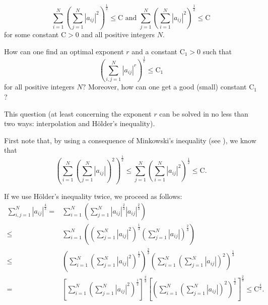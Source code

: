 \documentclass[10pt]{amsart}
\numberwithin{equation}{section}
\begin{document}
\begin{equation}
\sum\limits_{i=1}^{N}\left( \sum\limits_{j=1}^{N}\left\vert
a_{ij}\right\vert ^{2}\right) ^{\frac{1}{2}}\leq \mathrm{C}\text{ and }\sum\limits_{j=1}^{N}\left( \sum\limits_{i=1}^{N}\left\vert
a_{ij}\right\vert ^{2}\right) ^{\frac{1}{2}}\leq \mathrm{C}  \label{221}
\end{equation}for some constant $\mathrm{C}>0$ and all positive integers $N$.

How can one find an optimal exponent $r$ and a constant $\mathrm{C}_{1}>0$
such that\begin{equation*}
\left( \sum\limits_{i,j=1}^{N}\left\vert a_{ij}\right\vert ^{r}\right) ^{\frac{1}{r}}\leq \mathrm{C}_{1}
\end{equation*}for all positive integers $N?$ Moreover, how can one get a good (small)
constant $\mathrm{C}_{1}$?

This question (at least concerning the exponent $r$ can be solved in no less
than two ways: interpolation and H\"{o}lder's inequality).

First note that, by using a consequence of Minkowski's inequality (see \cite{garling}), we know that
\begin{equation}
\left( \sum\limits_{i=1}^{N}\left( \sum\limits_{j=1}^{N}\left\vert
a_{ij}\right\vert \right) ^{2}\right) ^{\frac{1}{2}}\leq
\sum\limits_{j=1}^{N}\left( \sum\limits_{i=1}^{N}\left\vert
a_{ij}\right\vert ^{2}\right) ^{\frac{1}{2}}\leq \mathrm{C}.  \label{222}
\end{equation}

If we use H\"{o}lder's inequality twice, we proceed as follows:
\begin{align*}
\sum\limits_{i,j=1}^{N}\left\vert a_{ij}\right\vert ^{\frac{4}{3}} = &
\sum\limits_{i=1}^{N}\left( \sum\limits_{j=1}^{N}\left\vert
a_{ij}\right\vert ^{\frac{2}{3}}\left\vert a_{ij}\right\vert ^{\frac{2}{3}}\right) \\
\leq & \sum\limits_{i=1}^{N}\left( \left( \sum\limits_{j=1}^{N}\left\vert
a_{ij}\right\vert ^{2}\right) ^{\frac{1}{3}}\left(
\sum\limits_{j=1}^{N}\left\vert a_{ij}\right\vert \right) ^{\frac{2}{3}}\right) \\
\leq & \left( \sum\limits_{i=1}^{N}\left( \sum\limits_{j=1}^{N}\left\vert
a_{ij}\right\vert ^{2}\right) ^{\frac{1}{2}}\right) ^{\frac{2}{3}}\left(
\sum\limits_{i=1}^{N}\left( \sum\limits_{j=1}^{N}\left\vert
a_{ij}\right\vert \right) ^{2}\right) ^{\frac{1}{3}} \\
= & \left[ \sum\limits_{i=1}^{N}\left( \sum\limits_{j=1}^{N}\left\vert
a_{ij}\right\vert ^{2}\right) ^{\frac{1}{2}}\right] ^{\frac{2}{3}}\left[
\left( \sum\limits_{i=1}^{N}\left( \sum\limits_{j=1}^{N}\left\vert
a_{ij}\right\vert \right) ^{2}\right) ^{\frac{1}{2}}\right] ^{\frac{2}{3}}
\leq \mathrm{C}^{\frac{4}{3}}.
\end{align*}
\end{document}
